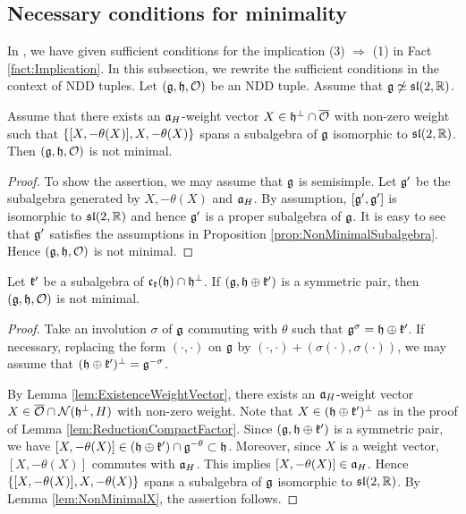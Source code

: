 \subsection{Necessary conditions for minimality}

In \cite[Theorem 21]{Ki24}, we have given sufficient conditions for the implication (3) $\Rightarrow$ (1) in Fact \ref{fact:Implication}.
In this subsection, we rewrite the sufficient conditions in the context of NDD tuples.
Let $(\mathfrak{g}, \mathfrak{h}, \mathcal{O})$ be an NDD tuple.
Assume that $\mathfrak{g} \not \simeq \mathfrak{sl}(2,\mathbb{R})$.

\begin{lemma} \label{lem:NonMinimalX}
	Assume that there exists an $\mathfrak{a}_H$-weight vector $X \in \mathfrak{h}^\perp \cap \overline{\mathcal{O}}$ with non-zero weight such that $\left\{[X, -\theta(X)], X, -\theta(X) \right\}$ spans a subalgebra of $\mathfrak{g}$ isomorphic to $\mathfrak{sl}(2,\mathbb{R})$.
	Then $(\mathfrak{g}, \mathfrak{h}, \mathcal{O})$ is not minimal.
\end{lemma}

\begin{proof}
	To show the assertion, we may assume that $\mathfrak{g}$ is semisimple.
	Let $\mathfrak{g}'$ be the subalgebra generated by $X, -\theta(X)$ and $\mathfrak{a}_H$.
	By assumption, $[\mathfrak{g}', \mathfrak{g}']$ is isomorphic to $\mathfrak{sl}(2,\mathbb{R})$ and hence $\mathfrak{g'}$ is a proper subalgebra of $\mathfrak{g}$.
	It is easy to see that $\mathfrak{g}'$ satisfies the assumptions in Proposition \ref{prop:NonMinimalSubalgebra}.
	Hence $(\mathfrak{g}, \mathfrak{h}, \mathcal{O})$ is not minimal.
\end{proof}

\begin{lemma} \label{lem:SufficientSymmetric}
	Let $\mathfrak{k}'$ be a subalgebra of $\mathfrak{c}_{\mathfrak{k}}(\mathfrak{h}) \cap \mathfrak{h}^\perp$.
	If $(\mathfrak{g}, \mathfrak{h} \oplus \mathfrak{k}')$ is a symmetric pair, then $(\mathfrak{g}, \mathfrak{h}, \mathcal{O})$ is not minimal.
\end{lemma}

\begin{proof}
	Take an involution $\sigma$ of $\mathfrak{g}$ commuting with $\theta$ such that $\mathfrak{g}^\sigma = \mathfrak{h} \oplus \mathfrak{k}'$.
	If necessary, replacing the form $(\cdot, \cdot)$ on $\mathfrak{g}$ by $(\cdot, \cdot) + (\sigma(\cdot), \sigma(\cdot))$, we may assume that $(\mathfrak{h} \oplus \mathfrak{k}')^\perp = \mathfrak{g}^{-\sigma}$.

	By Lemma \ref{lem:ExistenceWeightVector}, there exists an $\mathfrak{a}_H$-weight vector $X \in \overline{\mathcal{O}} \cap \mathcal{N}(\mathfrak{h}^\perp, H)$ with non-zero weight.
	Note that $X \in (\mathfrak{h}\oplus \mathfrak{k}')^\perp$ as in the proof of Lemma \ref{lem:ReductionCompactFactor}.
	Since $(\mathfrak{g}, \mathfrak{h} \oplus \mathfrak{k}')$ is a symmetric pair, we have $[X, -\theta(X)] \in (\mathfrak{h} \oplus \mathfrak{k}') \cap \mathfrak{g}^{-\theta} \subset \mathfrak{h}$.
	Moreover, since $X$ is a weight vector, $[X, -\theta(X)]$ commutes with $\mathfrak{a}_H$.
	This implies $[X, -\theta(X)] \in \mathfrak{a}_H$.
	Hence $\left\{[X, -\theta(X)], X, -\theta(X) \right\}$ spans a subalgebra of $\mathfrak{g}$ isomorphic to $\mathfrak{sl}(2,\mathbb{R})$.
	By Lemma \ref{lem:NonMinimalX}, the assertion follows.
\end{proof}

